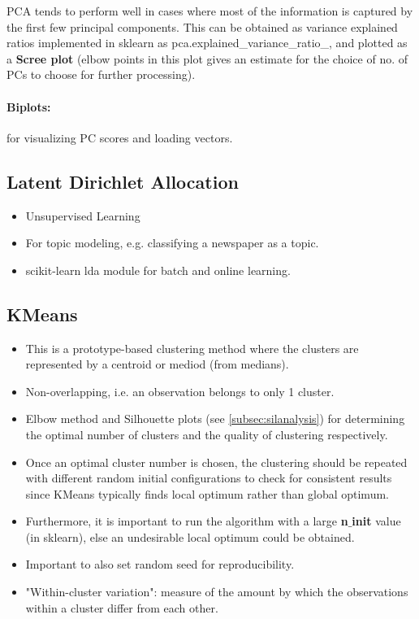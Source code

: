 \documentclass[a4paper, 12pt]{report}
\begin{document}
PCA tends to perform well in cases where most of the information is captured by the first few principal components. This can be obtained as variance explained ratios implemented in sklearn as pca.explained\_variance\_ratio\_, and plotted as a \textbf{Scree plot} (elbow points in this plot gives an estimate for the choice of no. of PCs to choose for further processing).

\paragraph{Biplots:}for visualizing PC scores and loading vectors.


\subsection{Latent Dirichlet Allocation}
\begin{itemize}
\item Unsupervised Learning
\item For topic modeling, e.g. classifying a newspaper as a topic.
\item {\color{cyan}scikit-learn lda module} for batch and online learning.
\end{itemize}

\subsection{KMeans}
\label{kmeans}
\begin{itemize}
\item This is a prototype-based clustering method where the clusters are represented by a centroid or mediod (from medians).
\item Non-overlapping, i.e. an observation belongs to only 1 cluster.
\item Elbow method and Silhouette plots (see  \autoref{subsec:silanalysis}) for determining the optimal number of clusters and the quality of clustering respectively.
\item Once an optimal cluster number is chosen, the clustering should be repeated with different random initial configurations to check for consistent results since KMeans typically finds local optimum rather than global optimum.
\item Furthermore, it is important to run the algorithm with a large \textbf{n$\_$init} value (in sklearn), else an undesirable local optimum could be obtained.
\item Important to also set random seed for reproducibility.
\item "Within-cluster variation": measure of the amount by which the observations within a cluster differ from each other.
\end{itemize}
\end{document}
